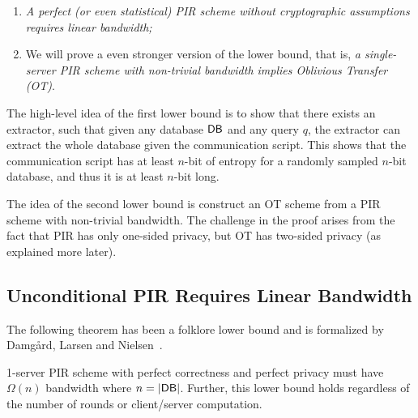 \begin{enumerate}
    \item \textit{A perfect (or even statistical) PIR scheme without cryptographic assumptions requires linear bandwidth;}
    \item We will prove a even stronger version of the lower bound, that is, 
\textit{a single-server PIR scheme with non-trivial bandwidth implies Oblivious Transfer (OT)}.
\end{enumerate}

The high-level idea of the first lower bound is to show that there exists an extractor, such that given any database ${\sf DB}$ and any query $q$, the extractor can extract the whole database given the communication script.
This shows that the communication script has at least $n$-bit of entropy for a  
randomly sampled $n$-bit database, 
and thus it is at least $n$-bit long. 

The idea of the second lower bound is construct an OT  
scheme from a PIR scheme 
with non-trivial bandwidth.
The challenge in the proof arises from the fact that PIR has only one-sided
privacy, but OT has two-sided privacy (as explained more later).







\subsection{Unconditional PIR Requires Linear Bandwidth}

The following theorem has been a folklore lower bound and is formalized by Damg\r{a}rd, Larsen and Nielsen~\cite{DLN19}.

\begin{theorem}
1-server PIR scheme with perfect correctness and perfect privacy must have $\Omega(n)$ bandwidth where $n = |{\sf DB}|$. Further, this lower bound holds
regardless of the number of rounds or client/server computation.
\end{theorem}

